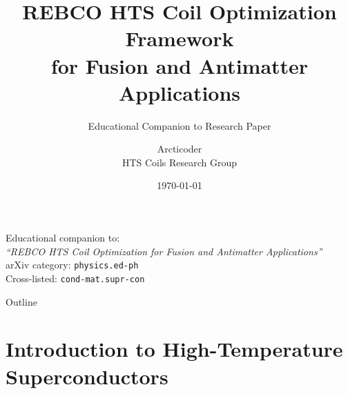\documentclass[aspectratio=169,xcolor={table,dvipsnames}]{beamer}
\title[REBCO HTS Coil Optimization]{REBCO HTS Coil Optimization Framework\\for Fusion and Antimatter Applications}
\subtitle{Educational Companion to Research Paper}
\author[Arcticoder]{Arcticoder\\HTS Coils Research Group}
\institute[HTS Lab]{High-Temperature Superconductor Laboratory}
\date{\today}
\begin{document}
\begin{frame}
    \titlepage
    \begin{center}
        \small
        Educational companion to:\\
        \textit{``REBCO HTS Coil Optimization for Fusion and Antimatter Applications''}\\
        \vspace{0.3cm}
        arXiv category: \texttt{physics.ed-ph}\\
        Cross-listed: \texttt{cond-mat.supr-con}
    \end{center}
\end{frame}

\begin{frame}{Outline}
    \tableofcontents
\end{frame}

\section{Introduction to High-Temperature Superconductors}
\end{document}
